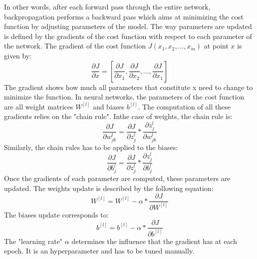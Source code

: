 In other words, after each forward pass through the entire network, backpropagation performs a backward pass which aims at minimizing the cost function by adjusting parameters of the model. The way parameters are updated is defined by the gradients of the cost function with respect to each parameter of the network. The gradient of the cost function $J(x_{1}, x_{2}, ..., x_{m})$ at point $x$ is given by:
\begin{equation}
\frac{\partial J}{\partial x} = [\frac{\partial J}{\partial x_{1}}, \frac{\partial J}{\partial x_{2}}, ..., \frac{\partial J}{\partial x_{1}}]
\end{equation}
The gradient shows how much all parameters that constitute x need to change to minimize the function. In neural networks, the parameters of the cost function are all weight matrices $W^{[l]}$ and biases $b^{[l]}$. The computation of all these gradients relies on the "chain rule". Inthe case of weights, the chain rule is:
\begin{equation}
\frac{\partial J}{\partial w_{jk}^{l}} = \frac{\partial J}{\partial z_{j}^{l}} * \frac{\partial z_{j}^{l}}{\partial w_{jk}^{l}}
\end{equation}
Similarly, the chain rules has to be applied to the biases:
\begin{equation}
\frac{\partial J}{\partial b_{j}^{l}} = \frac{\partial J}{\partial z_{j}^{l}} * \frac{\partial z_{j}^{l}}{\partial b_{j}^{l}}
\end{equation}
Once the gradients of each parameter are computed, these parameters are updated. The weights update is described by the following equation:
\begin{equation}
W^{[l]} = W^{[l]} - \alpha * \frac{\partial J}{\partial W^{[l]}}
\end{equation}
The biases update corresponds to:
\begin{equation}
b^{[l]} = b^{[l]} - \alpha * \frac{\partial J}{\partial b^{[l]}}
\end{equation}
The "learning rate" $\alpha$ determines the influence that the gradient has at each epoch. It is an hyperparameter and has to be tuned manually.



